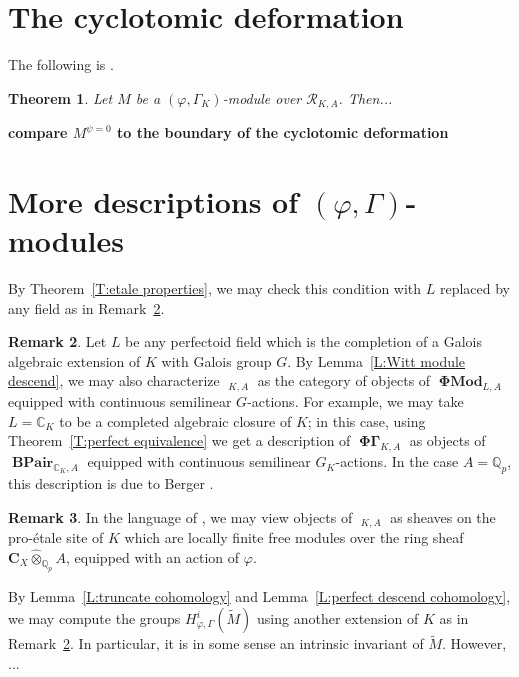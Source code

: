 \documentclass[12pt]{amsart}
\newtheorem{theorem}{Theorem}[section]
\theoremstyle{definition}
\newtheorem{remark}[theorem]{Remark}
\numberwithin{equation}{theorem}
\newcommand{\bC}{\mathbf{C}}
\newcommand{\CC}{\mathbb{C}}
\newcommand{\Qp}{\mathbb{Q}_p}
\newcommand{\QQ}{\mathbb{Q}}
\newcommand{\calR}{\mathcal{R}}
\DeclareMathOperator{\BPair}{\mathbf{BPair}}
\DeclareMathOperator{\PhiGamma}{\mathbf{\Phi \Gamma}}
\DeclareMathOperator{\PhiGammatilde}{\widetilde{\mathbf{\Phi \Gamma}}}
\DeclareMathOperator{\PhiMod}{\mathbf{\Phi Mod}}
\begin{document}
\section{The cyclotomic deformation}



The following is \cite[Theorem~4.4.8]{kpx}.
\begin{theorem}
Let $M$ be a $(\varphi, \Gamma_K)$-module over $\calR_{K,A}$. Then...
\end{theorem}


\textbf{compare $M^{\psi=0}$ to the boundary of the cyclotomic deformation}

\section{More descriptions of $(\varphi, \Gamma)$-modules}
\label{sec:more descriptions}

By Theorem~\ref{T:etale properties}, we may check this condition 
with $L$ replaced by any field as in
Remark~\ref{R:general field}.

\begin{remark} \label{R:general field}
Let $L$ be any perfectoid field which is the completion of a Galois algebraic extension of $K$ with Galois group $G$.
By Lemma~\ref{L:Witt module descend}, we may also characterize $\PhiGammatilde_{K,A}$ 
as the category of objects of $\PhiMod_{L,A}$ equipped with continuous semilinear $G$-actions. For example, we may take $L = \CC_K$ to be a completed algebraic closure of $K$;
in this case, using Theorem~\ref{T:perfect equivalence} we get a description of
$\PhiGamma_{K,A}$ as objects of $\BPair_{\CC_K,A}$ equipped with continuous semilinear $G_K$-actions. In the case $A = \QQ_p$, this description is due to Berger \cite{berger-b-pairs}.
\end{remark}

\begin{remark}
In the language of \cite{kedlaya-liu1}, we may view objects of $\PhiGammatilde_{K,A}$
as sheaves on the pro-\'etale site of $K$ which are locally finite free modules over the ring sheaf $\bC_X \widehat{\otimes}_{\Qp} A$, equipped with an action of $\varphi$.
\end{remark}

By Lemma~\ref{L:truncate cohomology} and Lemma~\ref{L:perfect descend cohomology},
we may compute the groups $H^i_{\varphi, \Gamma}(\tilde{M})$
using another extension of $K$ as in Remark~\ref{R:general field}. In particular, it is in some sense an intrinsic invariant of $\tilde{M}$. However, ...
\end{document}
